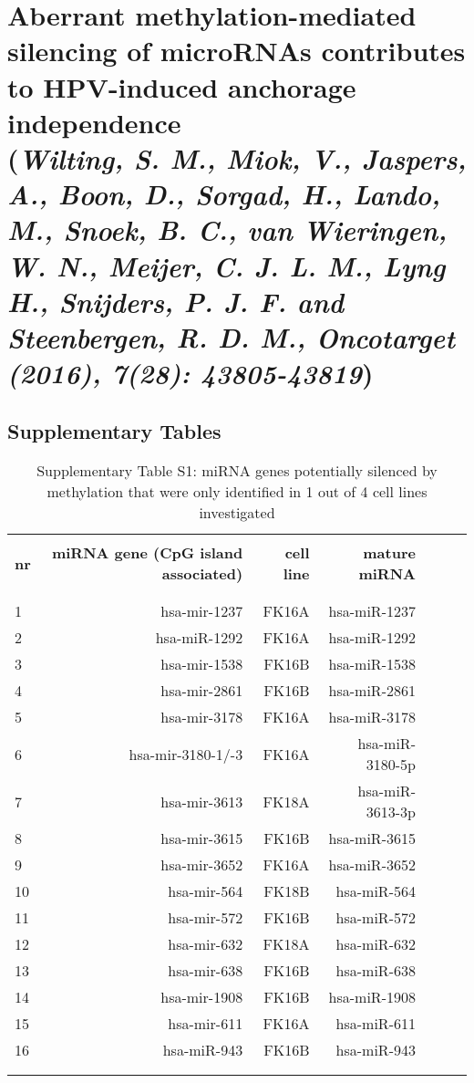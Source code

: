 \chapter{Aberrant methylation-mediated silencing of microRNAs contributes to HPV-induced anchorage independence \\ {\footnotesize (\textit{Wilting, S. M., Miok, V., Jaspers, A., Boon, D., Sorgad, H., Lando, M., Snoek, B. C., van Wieringen, W. N., Meijer, C. J. L. M., Lyng H., Snijders, P. J. F. and Steenbergen, R. D. M., Oncotarget (2016), 7(28): 43805-43819})}}
\label{chapter:Window estimator}

\graphicspath{{Chapte6/Figs/}{Chapter6/Figs/PDF/}{Chapter6/Figs/}}%


\section{Supplementary Tables}
\newpage

\begin{table}
{%
\begin{tabular}{lrrrlll}
\hline
& & & & & & \\
\textbf{nr}	&	\textbf{miRNA gene (CpG island associated)}	&	\textbf{cell line}	&	\textbf{mature miRNA}\\
& & & & & &
\\
\hline
& & & & & &
\\
1	&	hsa-mir-1237	&	FK16A	&	hsa-miR-1237\\
2	&	hsa-miR-1292	&	FK16A	&	hsa-miR-1292\\
3	&	hsa-mir-1538	&	FK16B	&	hsa-miR-1538\\
4	&	hsa-mir-2861	&	FK16B	&	hsa-miR-2861\\
5	&	hsa-mir-3178	&	FK16A	&	hsa-miR-3178\\
6	&	hsa-mir-3180-1/-3	&	FK16A	&	hsa-miR-3180-5p\\
7	&	hsa-mir-3613	&	FK18A	&	hsa-miR-3613-3p\\
8	&	hsa-mir-3615	&	FK16B	&	hsa-miR-3615\\
9	&	hsa-mir-3652	&	FK16A	&	hsa-miR-3652\\
10	&	hsa-mir-564	&	FK18B	&	hsa-miR-564\\
11	&	hsa-mir-572	&	FK16B	&	hsa-miR-572\\
12	&	hsa-mir-632	&	FK18A	&	hsa-miR-632\\
13	&	hsa-mir-638	&	FK16B	&	hsa-miR-638\\
14	&	hsa-mir-1908	&	FK16B	&	hsa-miR-1908\\
15	&	hsa-mir-611	&	FK16A	&	hsa-miR-611\\
16	&	hsa-miR-943	&	FK16B   	&	hsa-miR-943\\
& & & & & &
\\
\hline & & & & & & \\
\end{tabular}
}
\label{tableSM:GEOdatasets}
\caption{Supplementary Table S1: miRNA genes potentially silenced by methylation that were only identified in 1 out of 4 cell lines investigated}
\end{table}

